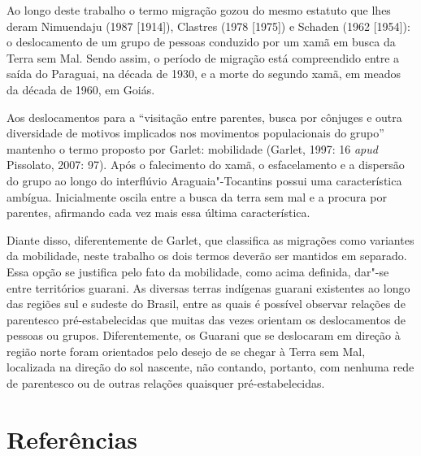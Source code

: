 Ao longo deste trabalho o termo migração gozou do mesmo estatuto que
lhes deram Nimuendaju (1987 [1914]), Clastres (1978 [1975]) e Schaden
(1962 [1954]): o deslocamento de um grupo de pessoas conduzido por um
xamã em busca da Terra sem Mal. Sendo assim, o período de migração está
compreendido entre a saída do Paraguai, na década de 1930, e a morte do
segundo xamã, em meados da década de 1960, em Goiás.

Aos deslocamentos para a ``visitação entre parentes, busca por cônjuges e
outra diversidade de motivos implicados nos movimentos populacionais do
grupo'' mantenho o termo proposto por Garlet: mobilidade (Garlet, 1997:
16 \emph{apud} Pissolato, 2007: 97). Após o falecimento do xamã, o
esfacelamento e a dispersão do grupo ao longo do interflúvio
Araguaia"-Tocantins possui uma característica ambígua. Inicialmente
oscila entre a busca da terra sem mal e a procura por parentes,
afirmando cada vez mais essa última característica. 

Diante disso, diferentemente de Garlet, que classifica as migrações como
variantes da mobilidade, neste trabalho os dois termos deverão ser
mantidos em separado. Essa opção se justifica pelo fato da mobilidade,
como acima definida, dar"-se entre territórios guarani. As diversas
terras indígenas guarani existentes ao longo das regiões sul e sudeste
do Brasil, entre as quais é possível observar relações de parentesco
pré-estabelecidas que muitas das vezes orientam os deslocamentos de
pessoas ou grupos. Diferentemente, os Guarani que se deslocaram em
direção à região norte foram orientados pelo desejo de se chegar à
Terra sem Mal, localizada na direção do sol nascente, não contando,
portanto, com nenhuma rede de parentesco ou de outras relações
quaisquer pré-estabelecidas.

\section{Referências}


